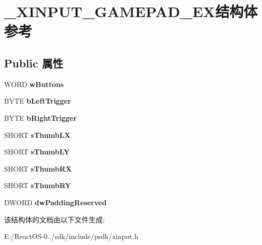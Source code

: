 \hypertarget{struct___x_i_n_p_u_t___g_a_m_e_p_a_d___e_x}{}\section{\+\_\+\+X\+I\+N\+P\+U\+T\+\_\+\+G\+A\+M\+E\+P\+A\+D\+\_\+\+E\+X结构体 参考}
\label{struct___x_i_n_p_u_t___g_a_m_e_p_a_d___e_x}
\subsection*{Public 属性}
\begin{DoxyCompactItemize}
\item 
\mbox{\label{struct___x_i_n_p_u_t___g_a_m_e_p_a_d___e_x_ad4100fc0ccd0b8c55c031c3b387adf67}} 
W\+O\+RD {\bfseries w\+Buttons}
\item 
\mbox{\label{struct___x_i_n_p_u_t___g_a_m_e_p_a_d___e_x_ae139c2bff4c0f14e25f2163dc6cb4f6f}} 
B\+Y\+TE {\bfseries b\+Left\+Trigger}
\item 
\mbox{\label{struct___x_i_n_p_u_t___g_a_m_e_p_a_d___e_x_a9fb27e2f36591c51deb450ac4808a3bd}} 
B\+Y\+TE {\bfseries b\+Right\+Trigger}
\item 
\mbox{\label{struct___x_i_n_p_u_t___g_a_m_e_p_a_d___e_x_ae905148f1b249674fd655a7840d6d471}} 
S\+H\+O\+RT {\bfseries s\+Thumb\+LX}
\item 
\mbox{\label{struct___x_i_n_p_u_t___g_a_m_e_p_a_d___e_x_a0439bb1263d33d71da043152d776658b}} 
S\+H\+O\+RT {\bfseries s\+Thumb\+LY}
\item 
\mbox{\label{struct___x_i_n_p_u_t___g_a_m_e_p_a_d___e_x_af218cea1ad554de56c557ebaff1af088}} 
S\+H\+O\+RT {\bfseries s\+Thumb\+RX}
\item 
\mbox{\label{struct___x_i_n_p_u_t___g_a_m_e_p_a_d___e_x_acc40d4dceed64a933d9cae5ca9e2b31a}} 
S\+H\+O\+RT {\bfseries s\+Thumb\+RY}
\item 
\mbox{\label{struct___x_i_n_p_u_t___g_a_m_e_p_a_d___e_x_ab92b48043662b4be4bc6aa8eff29f9a6}} 
D\+W\+O\+RD {\bfseries dw\+Padding\+Reserved}
\end{DoxyCompactItemize}


该结构体的文档由以下文件生成\+:\begin{DoxyCompactItemize}
\item 
E\+:/\+React\+O\+S-\/0../sdk/include/psdk/xinput.\+h\end{DoxyCompactItemize}
